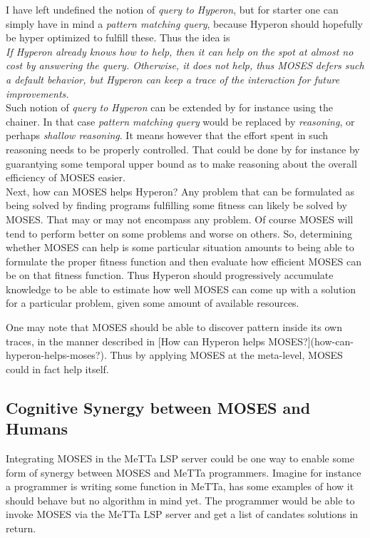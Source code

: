 \documentclass[]{report}
\begin{document}
I have left undefined the notion of \emph{query to Hyperon}, but for
starter one can simply have in mind a \emph{pattern matching query},
because Hyperon should hopefully be hyper optimized to fulfill these.
Thus the idea is\\

\emph{If Hyperon already knows how to help, then it can help on the spot at
almost no cost by answering the query.  Otherwise, it does not help,
thus MOSES defers such a default behavior, but Hyperon can keep a
trace of the interaction for future improvements.}\\

Such notion of \emph{query to Hyperon} can be extended by for instance
using the chainer.  In that case \emph{pattern matching query} would
be replaced by \emph{reasoning}, or perhaps \emph{shallow reasoning}.
It means however that the effort spent in such reasoning needs to be
properly controlled.  That could be done by for instance by
guarantying some temporal upper bound as to make reasoning about the
overall efficiency of MOSES easier.\\

Next, how can MOSES helps Hyperon? Any problem that can be formulated
as being solved by finding programs fulfilling some fitness can likely
be solved by MOSES.  That may or may not encompass any problem.  Of
course MOSES will tend to perform better on some problems and worse on
others.  So, determining whether MOSES can help is some particular
situation amounts to being able to formulate the proper fitness
function and then evaluate how efficient MOSES can be on that fitness
function.  Thus Hyperon should progressively accumulate knowledge to
be able to estimate how well MOSES can come up with a solution for a
particular problem, given some amount of available resources.

One may note that MOSES should be able to discover pattern inside its
own traces, in the manner described in [How can Hyperon helps
MOSES?](how-can-hyperon-helps-moses?).  Thus by applying MOSES at the
meta-level, MOSES could in fact help itself.

\subsection{Cognitive Synergy between MOSES and Humans}

Integrating MOSES in the MeTTa LSP server could be one way to enable
some form of synergy between MOSES and MeTTa programmers.  Imagine for
instance a programmer is writing some function in MeTTa, has some
examples of how it should behave but no algorithm in mind yet.  The
programmer would be able to invoke MOSES via the MeTTa LSP server and
get a list of candates solutions in return.
\end{document}
